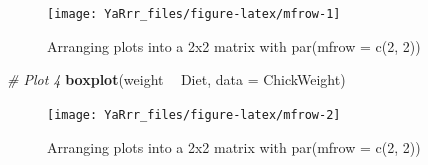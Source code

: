 \documentclass[]{book}
\newenvironment{Shaded}{\begin{snugshade}}{\end{snugshade}}
\newcommand{\KeywordTok}[1]{\textcolor[rgb]{0.13,0.29,0.53}{\textbf{#1}}}
\newcommand{\DataTypeTok}[1]{\textcolor[rgb]{0.13,0.29,0.53}{#1}}
\newcommand{\DecValTok}[1]{\textcolor[rgb]{0.00,0.00,0.81}{#1}}
\newcommand{\StringTok}[1]{\textcolor[rgb]{0.31,0.60,0.02}{#1}}
\newcommand{\CommentTok}[1]{\textcolor[rgb]{0.56,0.35,0.01}{\textit{#1}}}
\newcommand{\OperatorTok}[1]{\textcolor[rgb]{0.81,0.36,0.00}{\textbf{#1}}}
\newcommand{\NormalTok}[1]{#1}
\theoremstyle{definition}
\theoremstyle{definition}
\theoremstyle{remark}
\begin{document}
\begin{Shaded}
\end{Shaded}

\begin{figure}

{\centering \texttt{[image: YaRrr\_files/figure-latex/mfrow-1]} 

}

\caption{Arranging plots into a 2x2 matrix with par(mfrow = c(2, 2))}\label{fig:mfrow1}
\end{figure}

\begin{Shaded}
\begin{Highlighting}[]

\CommentTok{# Plot 4}
\KeywordTok{boxplot}\NormalTok{(weight }\OperatorTok{~}\StringTok{ }\NormalTok{Diet, }
           \DataTypeTok{data =}\NormalTok{ ChickWeight)}
\end{Highlighting}
\end{Shaded}

\begin{figure}

{\centering \texttt{[image: YaRrr\_files/figure-latex/mfrow-2]} 

}

\caption{Arranging plots into a 2x2 matrix with par(mfrow = c(2, 2))}\label{fig:mfrow2}
\end{figure}
\end{document}
